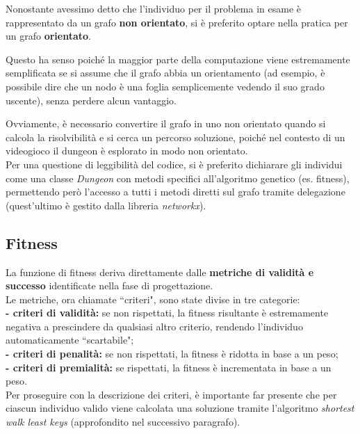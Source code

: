 \documentclass[12pt,titlepage]{article}
\begin{document}
Nonostante avessimo detto che l'individuo per il problema in esame è rappresentato da un grafo \textbf{non orientato}, si è preferito optare nella pratica per un grafo \textbf{orientato}.

Questo ha senso poiché la maggior parte della computazione viene estremamente semplificata se si assume che il grafo abbia un orientamento (ad esempio, è possibile dire che un nodo è una foglia semplicemente vedendo il suo grado uscente), senza perdere alcun vantaggio.

Ovviamente, è necessario convertire il grafo in uno non orientato quando si calcola la risolvibilità e si cerca un percorso soluzione, poiché nel contesto di un videogioco il dungeon è esplorato in modo non orientato. \\

\noindent Per una questione di leggibilità del codice, si è preferito dichiarare gli individui come una classe \textit{Dungeon} con metodi specifici all'algoritmo genetico (es. fitness), permettendo però l'accesso a tutti i metodi diretti sul grafo tramite delegazione (quest'ultimo è gestito dalla libreria \textit{networkx}).

\subsection {Fitness}

La funzione di fitness deriva direttamente dalle \textbf{metriche di validità e successo} identificate nella fase di progettazione.\\

\noindent Le metriche, ora chiamate ``criteri", sono state divise in tre categorie:\\
\textbf{- criteri di validità:} se non rispettati, la fitness risultante è estremamente negativa a prescindere da qualsiasi altro criterio, rendendo l'individuo automaticamente ``scartabile";\\
\textbf{- criteri di penalità:} se non rispettati, la fitness è ridotta in base a un peso;\\
\textbf{- criteri di premialità:} se rispettati, la fitness è incrementata in base a un peso.\\

\noindent Per proseguire con la descrizione dei criteri, è importante far presente che per ciascun individuo valido viene calcolata una soluzione tramite l'algoritmo \textit{shortest walk least keys} (approfondito nel successivo paragrafo).
\end{document}
